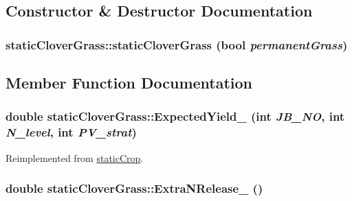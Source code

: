 \subsection{Constructor \& Destructor Documentation}
\hypertarget{classstatic_clover_grass_a2a75c00ffc15dccb394517f789ea51a7}{
\subsubsection[{staticCloverGrass}]{\setlength{\rightskip}{0pt plus 5cm}staticCloverGrass::staticCloverGrass (bool {\em permanentGrass})}}
\label{classstatic_clover_grass_a2a75c00ffc15dccb394517f789ea51a7}


\subsection{Member Function Documentation}
\hypertarget{classstatic_clover_grass_a17e80290c27da7304243f8ac3211631f}{
\subsubsection[{ExpectedYield\_\-}]{\setlength{\rightskip}{0pt plus 5cm}double staticCloverGrass::ExpectedYield\_\- (int {\em JB\_\-NO}, \/  int {\em N\_\-level}, \/  int {\em PV\_\-strat})}}
\label{classstatic_clover_grass_a17e80290c27da7304243f8ac3211631f}


Reimplemented from \hyperlink{classstatic_crop_ab7b9a8ecb31b10c4dcf44f13000e2f8c}{staticCrop}.\hypertarget{classstatic_clover_grass_adc4ac213c2bf4b59ad590a634d13ff4a}{
\subsubsection[{ExtraNRelease\_\-}]{\setlength{\rightskip}{0pt plus 5cm}double staticCloverGrass::ExtraNRelease\_\- ()}}
\label{classstatic_clover_grass_adc4ac213c2bf4b59ad590a634d13ff4a}


